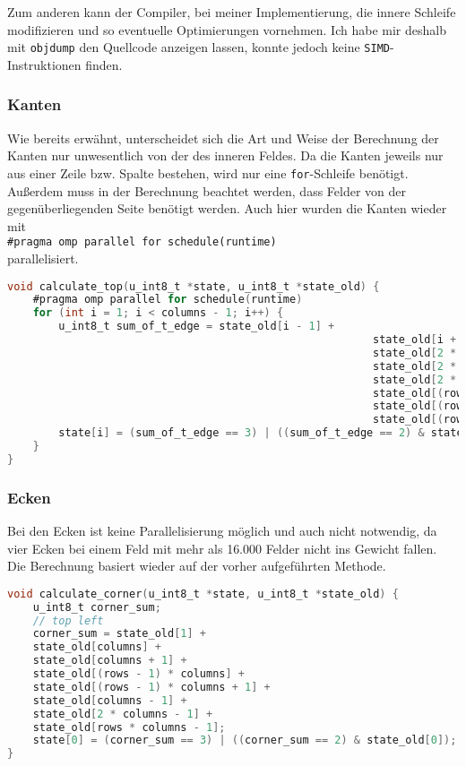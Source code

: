 \documentclass[german,plainarticle,hyperref,utf8]{zihpub}
\begin{document}
	Zum anderen kann der Compiler, bei meiner Implementierung, die innere Schleife modifizieren und so eventuelle Optimierungen vornehmen. Ich habe mir deshalb mit \texttt{objdump} den Quellcode anzeigen lassen, konnte jedoch keine \texttt{SIMD}-Instruktionen finden.
	
	\subsubsection{Kanten}
	
	Wie bereits erwähnt, unterscheidet sich die Art und Weise der Berechnung der Kanten nur unwesentlich von der des inneren Feldes. Da die Kanten jeweils nur aus einer Zeile bzw. Spalte bestehen, wird nur eine \texttt{for}-Schleife benötigt. Außerdem muss in der Berechnung beachtet werden, dass Felder von der gegenüberliegenden Seite benötigt werden.
	Auch hier wurden die Kanten wieder mit\\
	
	\texttt{\#pragma omp parallel for schedule(runtime)}\\
	
	parallelisiert.	
	\begin{lstlisting}[language=C, caption=Berechnung der obersten Zeile]
void calculate_top(u_int8_t *state, u_int8_t *state_old) {
	#pragma omp parallel for schedule(runtime)
	for (int i = 1; i < columns - 1; i++) {
		u_int8_t sum_of_t_edge = state_old[i - 1] +
														 state_old[i + 1] +
														 state_old[2 * columns + (i - 1)] +
														 state_old[2 * columns + i] +
														 state_old[2 * columns + (i + 1)] +
														 state_old[(rows - 1) * columns + i] +
														 state_old[(rows - 1) * columns + i + 1] +
														 state_old[(rows - 1) * columns + i - 1];
		state[i] = (sum_of_t_edge == 3) | ((sum_of_t_edge == 2) & state_old[i]);
	}
}\end{lstlisting}

	\subsubsection{Ecken}
	Bei den Ecken ist keine Parallelisierung möglich und auch nicht notwendig, da vier Ecken bei einem Feld mit mehr als 16.000 Felder nicht ins Gewicht fallen.\\
	Die Berechnung basiert wieder auf der vorher aufgeführten Methode.\\
	
	\begin{lstlisting}[language=C, caption=Berechnung der Ecke oben links]
void calculate_corner(u_int8_t *state, u_int8_t *state_old) {
	u_int8_t corner_sum;
	// top left
	corner_sum = state_old[1] +
	state_old[columns] +
	state_old[columns + 1] +
	state_old[(rows - 1) * columns] +
	state_old[(rows - 1) * columns + 1] +
	state_old[columns - 1] +
	state_old[2 * columns - 1] +
	state_old[rows * columns - 1];
	state[0] = (corner_sum == 3) | ((corner_sum == 2) & state_old[0]);
}\end{lstlisting}
	
\end{document}
